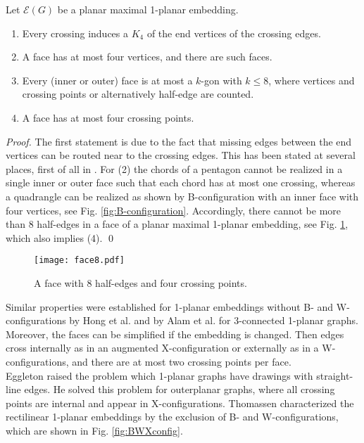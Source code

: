 \documentclass[runningheads]{llncs}
\begin{document}
\begin{lemma}
Let $\mathcal{E}(G)$ be a planar maximal 1-planar embedding.
\begin{enumerate}
  \item Every crossing induces a $K_4$ of the end vertices of the crossing edges.
  \item A face has  at most four  vertices, and there are
  such faces.
  \item Every (inner or outer) face is at most a $k$-gon with $k \leq 8$,
  where vertices and crossing points or alternatively half-edge
   are counted.
   \item A face has at most four crossing points.
\end{enumerate}
\end{lemma}

\begin{proof}
The first statement is due to the fact that  missing edges between
the end vertices can be routed near to the crossing edges. This has
been stated at several places, first of all in \cite{bhw-1og-84}.
For (2) the chords of a pentagon cannot be realized in a single
inner or outer face such that each chord has at most one crossing,
whereas a quadrangle can be realized as shown by  B-configuration
with an inner face with four vertices, see Fig.
\ref{fig:B-configuration}. Accordingly, there cannot be more than
$8$ half-edges in a face of a planar maximal 1-planar embedding, see
Fig. \ref{fig:face-8}, which also implies (4). \qed
\end{proof}


\begin{figure}
   \begin{center}
     \texttt{[image: face8.pdf]}
     \caption{A face with 8 half-edges and four crossing points.
     \label{fig:face-8}}
   \end{center}
\end{figure}



Similar properties  were established
 for 1-planar embeddings without B- and W-configurations by Hong et al.
\cite{help-ft1pg-12} and by Alam et al. \cite{abk-sld3c-13} for
3-connected 1-planar graphs. Moreover, the faces can be simplified
if the embedding is changed. Then edges cross internally as in an
augmented X-configuration or externally as in a W-configurations,
and there
are at most two crossing points per face.\\


Eggleton \cite{e-rdg-86} raised the problem which  1-planar graphs
have drawings with straight-line edges. He solved this problem for
outerplanar graphs, where all crossing points are internal and
appear in X-configurations. Thomassen \cite{t-rdg-88}  characterized
the rectilinear 1-planar embeddings  by the exclusion of B- and
W-configurations, which are shown in Fig. \ref{fig:BWXconfig}.
\end{document}
